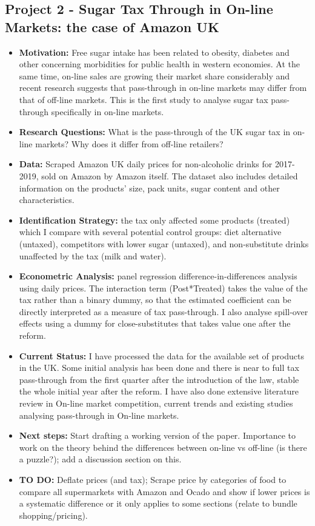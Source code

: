\documentclass[12pt]{article}%
\begin{document}
\subsection*{Project 2 - Sugar Tax Through in On-line Markets: the case of Amazon UK}

\begin{itemize}
	\item \textbf{Motivation:} Free sugar intake has been related to obesity, diabetes and other concerning morbidities for public health in western economies. At the same time, on-line sales are growing their market share considerably and recent research suggests that pass-through in on-line markets may differ from that of off-line markets. This is the first study to analyse sugar tax pass-through specifically in on-line markets.
	\item \textbf{Research Questions:}  What is the pass-through of the UK sugar tax in on-line markets? Why does it differ from off-line retailers?
	\item \textbf{Data:} Scraped Amazon UK daily prices for non-alcoholic drinks for 2017-2019, sold on Amazon by Amazon itself. The dataset also includes detailed information on the products' size, pack units, sugar content and other characteristics.
	\item \textbf{Identification Strategy:} the tax only affected some products (treated) which I compare with several potential control groups: diet alternative (untaxed), competitors with lower sugar (untaxed), and non-substitute drinks unaffected by the tax (milk and water).
	\item \textbf{Econometric Analysis:} panel regression difference-in-differences analysis using daily prices. The interaction term (Post*Treated) takes the value of the tax rather than a binary dummy, so that the estimated coefficient can be directly interpreted as a measure of tax pass-through. I also analyse spill-over effects using a dummy for close-substitutes that takes value one after the reform.
	\item \textbf{Current Status:} I have processed the data for the available set of products in the UK. Some initial analysis has been done and there is near to full tax pass-through from the first quarter after the introduction of the law, stable the whole initial year after the reform. I have also done extensive literature review in On-line market competition, current trends and existing studies analysing pass-through in On-line markets.
	\item \textbf{Next steps:} Start drafting a working version of the paper. Importance to work on the theory behind the differences between on-line vs off-line (is there a puzzle?); add a discussion section on this.
	\item \textbf{TO DO:} Deflate prices (and tax); Scrape price by categories of food to compare all supermarkets with Amazon and Ocado and show if lower prices is a systematic difference or it only applies to some sections (relate to bundle shopping/pricing).
\end{itemize}
\end{document}

